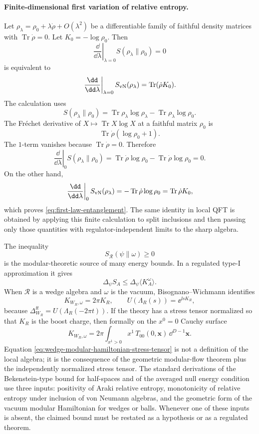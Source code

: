 \paragraph{Finite-dimensional first variation of relative entropy.}
Let \(\rho_\lambda=\rho_0+\lambda\dot\rho+O(\lambda^2)\) be a differentiable
family of faithful density matrices with \(\operatorname{Tr}\dot\rho=0\).
Let \(K_0=-\log\rho_0\).  Then
\[
  \left.\frac{\dd}{\dd\lambda}\right|_{\lambda=0}
  S(\rho_\lambda\|\rho_0)=0
\]
is equivalent to
\begin{equation}
  \left.\frac{\dd}{\dd\lambda}\right|_{\lambda=0}
  S_{\rm vN}(\rho_\lambda)
  =
  \operatorname{Tr}(\dot\rho K_0).
  \label{eq:first-law-entanglement}
\end{equation}
The calculation uses
\[
  S(\rho_\lambda\|\rho_0)
  =
  \operatorname{Tr}\rho_\lambda\log\rho_\lambda
  -
  \operatorname{Tr}\rho_\lambda\log\rho_0 .
\]
The Fr\'echet derivative of \(X\mapsto\operatorname{Tr}X\log X\) at a faithful
matrix \(\rho_0\) is
\[
  \operatorname{Tr}\dot\rho(\log\rho_0+1).
\]
The \(1\)-term vanishes because \(\operatorname{Tr}\dot\rho=0\).  Therefore
\[
  \left.\frac{\dd}{\dd\lambda}\right|_{0}
  S(\rho_\lambda\|\rho_0)
  =
  \operatorname{Tr}\dot\rho\log\rho_0
  -
  \operatorname{Tr}\dot\rho\log\rho_0
  =
  0.
\]
On the other hand,
\[
  \left.\frac{\dd}{\dd\lambda}\right|_{0}
  S_{\rm vN}(\rho_\lambda)
  =
  -\operatorname{Tr}\dot\rho\log\rho_0
  =
  \operatorname{Tr}\dot\rho K_0,
\]
which proves \eqref{eq:first-law-entanglement}.  The same identity in local
QFT is obtained by applying this finite calculation to split inclusions and
then passing only those quantities with regulator-independent limits to the
sharp algebra.

The inequality
\[
  S_{\mathcal R}(\psi\|\omega)\ge0
\]
is the modular-theoretic source of many energy bounds.  In a regulated
type-I approximation it gives
\[
  \Delta_\psi S_A\le \Delta_\psi\langle K_A^\omega\rangle .
\]
When \(\mathcal R\) is a wedge algebra and \(\omega\) is the vacuum,
Bisognano--Wichmann identifies
\[
  K_{W_R,\omega}=2\pi K_R,
  \qquad U(\Lambda_R(s))=\ee^{\ii sK_R},
\]
because \(\Delta_{W_R}^{\ii t}=U(\Lambda_R(-2\pi t))\).  If the theory has a
stress tensor normalized so that \(K_R\) is the boost charge, then formally on
the \(x^0=0\) Cauchy surface
\begin{equation}
  K_{W_R,\omega}
  =
  2\pi\int_{x^1>0} x^1\,T_{00}(0,\mathbf x)\,\dd^{D-1}\mathbf x .
  \label{eq:wedge-modular-hamiltonian-stress-tensor}
\end{equation}
Equation \eqref{eq:wedge-modular-hamiltonian-stress-tensor} is not a
definition of the local algebra; it is the consequence of the geometric
modular-flow theorem plus the independently normalized stress tensor.  The
standard derivations of the Bekenstein-type bound for half-spaces and of the
averaged null energy condition use three inputs: positivity of Araki relative
entropy, monotonicity of relative entropy under inclusion of von Neumann
algebras, and the geometric form of the vacuum modular Hamiltonian for wedges
or balls.  Whenever one of these inputs is absent, the claimed bound must be
restated as a hypothesis or as a regulated theorem.

